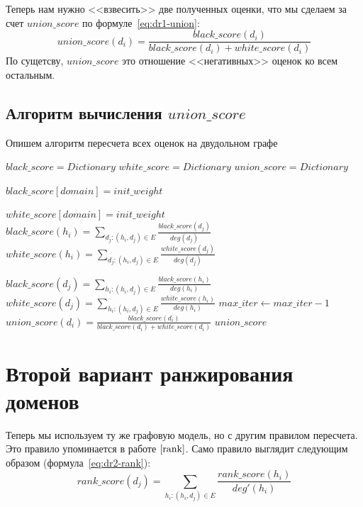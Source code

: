 \documentclass[a4paper,14pt]{extreport} %
\begin{document}
Теперь нам нужно <<взвесить>> две полученных оценки, что мы сделаем за счет $union\_score$ по формуле~\ref{eq:dr1-union}:
\begin{equation}
	\label{eq:dr1-union}
	union\_score(d_i) = \frac{black\_score(d_i)}{black\_score(d_i) + white\_score(d_i)}
\end{equation}
По сущетсву, $union\_score$ это отношение <<негативных>> оценок ко всем остальным.

\subsection{Алгоритм вычисления $union\_score$}
\label{alg:us}
Опишем алгоритм пересчета всех оценок на двудольном графе
\begin{algorithmic}
	\State $black\_score = Dictionary$
	\State $white\_score = Dictionary$
	\State $union\_score = Dictionary$
			
			
	\State $black\_score[domain] = init\_weight$
	\EndFor
			
	\State $white\_score[domain] = init\_weight$
	\EndFor
	\State $black\_score(h_i) = \sum_{d_j: (h_i, d_j)\in E} \frac{black\_score(d_j)}{deg(d_j)}$
	\State $white\_score(h_i) = \sum_{d_j: (h_i, d_j)\in E} \frac{white\_score(d_j)}{deg(d_j)}$
	\EndFor
				
	\State $black\_score(d_j) = \sum_{h_i: (h_i, d_j)\in E} \frac{black\_score(h_i)}{deg(h_i)}$
	\State $white\_score(d_j) = \sum_{h_i: (h_i, d_j)\in E} \frac{white\_score(h_i)}{deg(h_i)}$
	\EndFor
	\State $max\_iter\gets max\_iter-1$
	\EndWhile
	\State $union\_score(d_i) = \frac{black\_score(d_i)}{black\_score(d_i) + white\_score(d_i)}$
	\EndFor
	\State \Return $union\_score$
	\EndFunction
\end{algorithmic}
	
\section{Второй вариант ранжирования доменов}
Теперь мы используем ту же графовую модель, но с другим правилом пересчета. Это правило упоминается в работе $\cite{rank}$. Само правило выглядит следующим образом (формула~\ref{eq:dr2-rank}):
\begin{equation}
	\label{eq:dr2-rank}
	rank\_score(d_j) = \sum_{h_i: (h_i, d_j)\in E} \frac{rank\_score(h_i)}{deg'(h_i)}
\end{equation}
	
\end{document}
